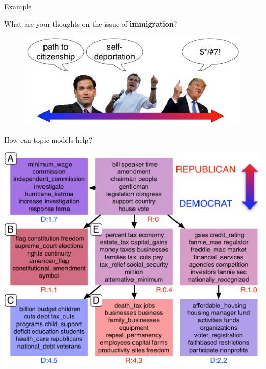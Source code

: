 \documentclass[compress]{beamer}
\begin{document}
\begin{frame}{Example}

    What are your thoughts on the issue of {\bf immigration}?
    \begin{figure}
    \centering
      \includegraphics[width=\textwidth]{teaparty/figures/framing}
    \end{figure}

\end{frame}

\begin{frame}{How can topic models help?}

\begin{center}
\includegraphics[width=0.7\linewidth]{shlda/ideology_topics} \\
\cite{nguyen-13}
\end{center}

\end{frame}
\end{document}
